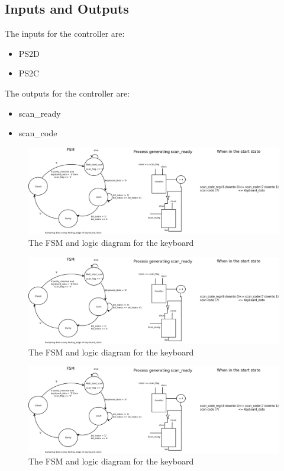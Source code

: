 \documentclass[conference]{IEEEtran}
\begin{document}
\subsection{Inputs and Outputs}
The inputs for the controller are:
\begin{itemize}
  \item PS2D
  \item PS2C
\end{itemize}

The outputs for the controller are:
\begin{itemize}
  \item scan\_ready
  \item scan\_code
\end{itemize}

\begin{figure}[!t]
\centering
\includegraphics[width=7in]{KBD1}
\caption{The FSM and logic diagram for the keyboard}
\label{KBD1}
\end{figure}


\begin{figure}[!t]
\centering
\includegraphics[width=7in]{KBD1}
\caption{The FSM and logic diagram for the keyboard}
\label{KBD1}
\end{figure}


\begin{figure}[!t]
\centering
\includegraphics[width=7in]{KBD1}
\caption{The FSM and logic diagram for the keyboard}
\label{KBD1}
\end{figure}
 
\end{document}
